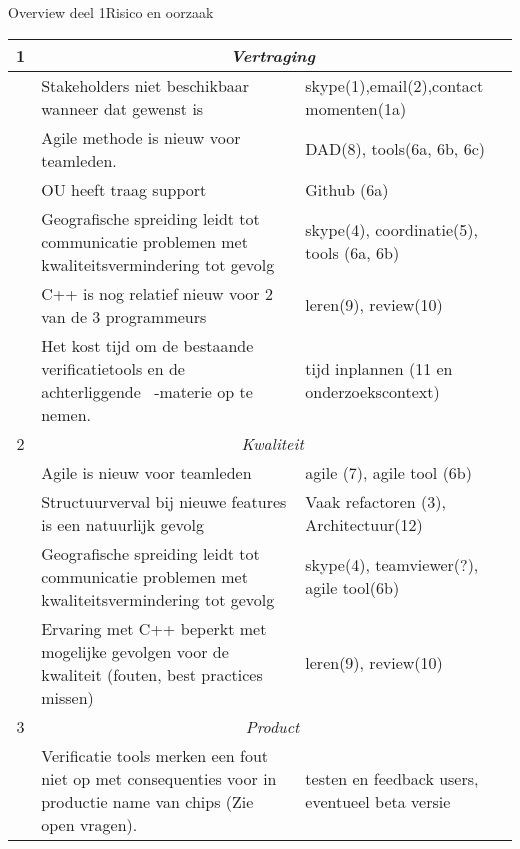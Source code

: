 \begin{frame}[fragile]{Overview deel 1}{Risico en oorzaak}

\begin{center}
    \tiny\sf
    \begin{tabular}{|c|p{23em}|p{13em}|}
	\hline
	1	& \multicolumn{2}{c|}{\sf\emph{\normalsize Vertraging}}
		\\\hline
		& Stakeholders niet beschikbaar wanneer dat gewenst is
		& skype(1),email(2),contact momenten(1a)
		\\\hline
		& Agile methode is nieuw voor teamleden.
		& DAD(8), tools(6a, 6b, 6c)
		\\\hline
		& OU heeft traag support
		& Github (6a)
		\\\hline
		& Geografische spreiding leidt tot communicatie problemen
		    met kwaliteitsvermindering tot gevolg
		& skype(4), coordinatie(5), tools (6a, 6b)
		\\\hline
		& C++ is nog relatief nieuw voor 2 van de 3 programmeurs
		& leren(9), review(10)
		\\\hline
		& Het kost tijd om de bestaande verificatietools en de achterliggende
		    \xmas\ -materie op te nemen.
		& tijd inplannen (11 en onderzoekscontext)
		\\\hline
	2 	& \multicolumn{2}{c|}{\sf\emph{\normalsize Kwaliteit}}
		\\\hline
		& Agile is nieuw voor teamleden
		& agile (7), agile tool (6b)
		\\\hline
		& Structuurverval bij nieuwe features is een natuurlijk
		gevolg
		& Vaak refactoren (3), Architectuur(12)
		\\\hline
		& Geografische spreiding leidt tot communicatie problemen
		met kwaliteitsvermindering tot gevolg
		& skype(4), teamviewer(?), agile tool(6b)
		\\\hline
		& Ervaring met C++ beperkt met mogelijke gevolgen
		voor de kwaliteit (fouten, best practices missen)
		& leren(9), review(10)
		\\\hline
	3	& \multicolumn{2}{c|}{\sf\emph{\normalsize Product}}
		\\\hline
		& Verificatie tools merken een fout niet op met consequenties voor
		  in productie name van chips (Zie open vragen).
		& testen en feedback users, eventueel beta versie
		\\\hline
        \end{tabular}
\end{center}

\end{frame}


